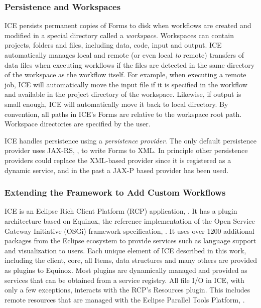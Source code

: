 \subsubsection{Persistence and
Workspaces}\label{persistence-and-workspaces}

ICE persists permanent copies of Forms to disk when workflows are
created and modified in a special directory called a \emph{workspace}.
Workspaces can contain projects, folders and files, including data,
code, input and output. ICE automatically manages local and remote (or
even local \emph{to} remote) transfers of data files when executing
workflows if the files are detected in the same directory of the
workspace as the workflow itself. For example, when executing a remote
job, ICE will automatically move the input file if it is specified in
the workflow and available in the project directory of the workspace.
Likewise, if output is small enough, ICE will automatically move it back
to local directory. By convention, all paths in ICE's Forms are
relative to the workspace root path. Workspace directories are specified
by the user.

ICE handles persistence using a \emph{persistence provider}. The only
default persistence provider uses JAX-RS, \cite{burke_restful_2010}, to write
Forms to XML. In principle other persistence providers could replace the
XML-based provider since it is registered as a dynamic service, and in
the past a JAX-P based provider has been used.

\subsubsection{Extending the Framework to Add Custom
Workflows}\label{framework}

ICE is an Eclipse Rich Client Platform (RCP) application,
\cite{mcaffer_eclipse_2010}. It has a plugin architecture based on Equinox, the
reference implementation of the Open Service Gateway Initiative (OSGi) framework specification, \cite{mcaffer_osgi_2010}. It uses over 1200 additional
packages from the Eclipse ecosystem to provide services such as language
support and visualization to users. Each unique element of ICE described
in this work, including the client, core, all Items, data structures and
many others are provided as plugins to Equinox. Most plugins are
dynamically managed and provided as services that can be obtained from a
service registry. All file I/O in ICE, with only a few exceptions,
interacts with the RCP's Resources plugin. This includes remote
resources that are managed with the Eclipse Parallel Tools Platform,
\cite{tibbitts_integrated_2009}.

